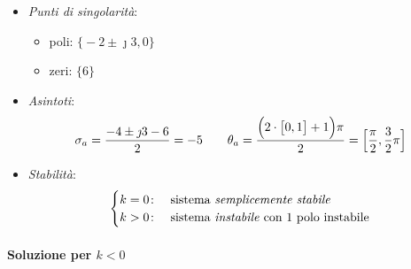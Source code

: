 \begin{esercizio}
\begin{itemize}
	\item \emph{Punti di singolarità}:
		\begin{itemize}
			\item poli: \(\bigl\{-2\pm\jmath3,0\bigr\}\)
			\item zeri: \(\bigl\{6\bigr\}\)
		\end{itemize}
	\item \emph{Asintoti}:
		\[
			\sigma_a = \frac{-4\pm\jmath3-6}{2} = -5 \qquad
			\theta_a = \frac{\Bigl(2\cdot\bigl[0,1\bigr]+1\Bigr)\pi}{2} = \Bigl[\frac{\pi}{2},\frac{3}{2}\pi\Bigr]
		\]
	\item \emph{Stabilità}:
		\[\begin{cases}
			k=0\colon & \text{sistema \emph{semplicemente stabile}} \\
			k>0\colon & \text{sistema \emph{instabile} con 1 polo instabile}
		\end{cases}\]
\end{itemize}

\paragraph{Soluzione per \(k<0\)}


\end{esercizio}
